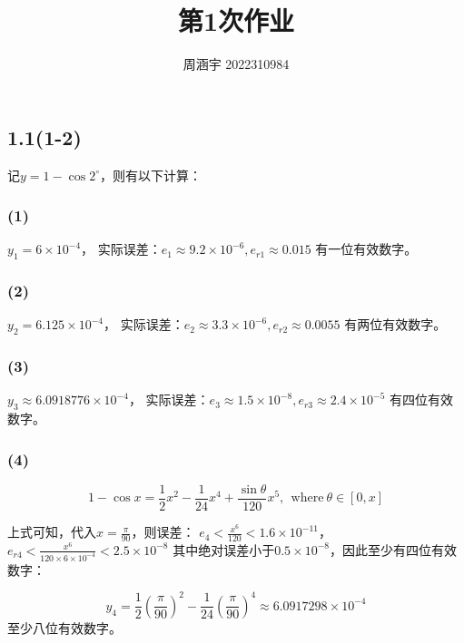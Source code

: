 \documentclass[UTF8,zihao=5]{ctexart}
\title{{\bfseries 第1次作业}}
\author{周涵宇 2022310984}
\date{}
\begin{document}
\maketitle

\subsection*{1.1(1-2)}

记$y=1-\cos{2^\circ}$，则有以下计算：

\subsubsection*{(1)}

$y_1=6\times10^{-4}$，
实际误差：$e_1\approx9.2\times10^{-6}, e_{r1}\approx0.015$
有一位有效数字。

\subsubsection*{(2)}

$y_2=6.125\times10^{-4}$，
实际误差：$e_2\approx3.3\times10^{-6}, e_{r2}\approx0.0055$
有两位有效数字。

\subsubsection*{(3)}

$y_3\approx6.0918776\times10^{-4}$，
实际误差：$e_3\approx1.5\times10^{-8}, e_{r3}\approx2.4\times10^{-5}$
有四位有效数字。

\subsubsection*{(4)}

\begin{equation*}
    1-\cos{x} = \frac{1}{2}x^2-\frac{1}{24}x^4+\frac{\sin{\theta}}{120}x^5,\ \
    \mathrm{where}\ \theta\in\left[0,x\right]
\end{equation*}

上式可知，代入$x=\frac{\pi}{90}$，则误差：
$e_4<\frac{x^6}{120}<1.6\times10^{-11}$，
$e_{r4}<\frac{x^6}{120\times6\times10^{-4}}<2.5\times10^{-8}$
其中绝对误差小于$0.5\times10^{-8}$，因此至少有四位有效数字：

\begin{equation*}
    y_4=\frac{1}{2}(\frac{\pi}{90})^2-\frac{1}{24}(\frac{\pi}{90})^4\approx6.0917298\times10^{-4}
\end{equation*}
至少八位有效数字。
\end{document}
